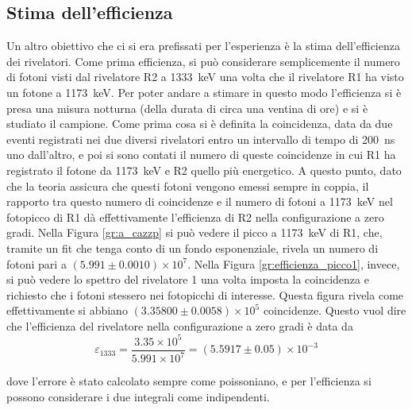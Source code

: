 \subsection{Stima dell'efficienza}
Un altro obiettivo che ci si era prefissati per l'esperienza è la stima dell'efficienza dei rivelatori. Come prima efficienza, si può considerare semplicemente il numero
di fotoni visti dal rivelatore R2 a 1333~keV una volta che il rivelatore R1 ha visto un fotone a 1173~keV. Per poter andare a stimare in questo modo l'efficienza si è presa
una misura notturna (della durata di circa una ventina di ore) e si è studiato il campione. Come prima cosa si è definita la coincidenza, data da due eventi
registrati nei due diversi rivelatori entro un intervallo di tempo di 200~ns uno dall'altro, e poi si sono contati il numero di queste coincidenze in cui R1 ha registrato
il fotone da 1173~keV e R2 quello più energetico. A questo punto, dato che la teoria assicura che questi fotoni vengono emessi sempre in coppia, il rapporto tra questo
numero di coincidenze e il numero di fotoni a 1173~keV nel fotopicco di R1 dà effettivamente l'efficienza di R2 nella configurazione a zero gradi. Nella
Figura \ref{gr:a_cazzp} si può vedere il picco a 1173~keV di R1, che, tramite un fit che tenga conto di un fondo esponenziale, rivela un numero
di fotoni pari a $(5.991 \pm 0.0010)\times 10^7$.
Nella Figura \ref{gr:efficienza_picco1}, invece, si può vedere lo spettro del rivelatore 1 una volta imposta la coincidenza e richiesto che i fotoni stessero
nei fotopicchi di interesse. Questa figura rivela come effettivamente si abbiano $(3.35800 \pm 0.0058)\times 10^5$ coincidenze. Questo vuol dire che l'efficienza del 
rivelatore nella configurazione
a zero gradi è data da
$$\varepsilon_{1333}=\frac{3.35\times 10^5}{5.991 \times 10^7}=(5.5917 \pm 0.05)\times 10^{-3}$$

%

dove l'errore è stato calcolato sempre come poissoniano, e per l'efficienza si possono considerare i due integrali come indipendenti.\\

